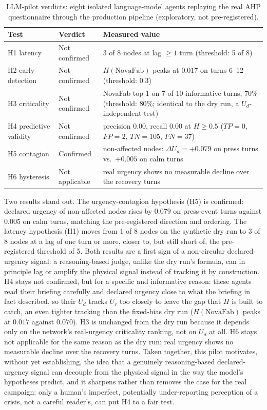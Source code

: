 \begin{table}[H]
\centering
\caption{LLM-pilot verdicts: eight isolated language-model agents replaying the real AHP questionnaire through the production pipeline (exploratory, not pre-registered).}
\label{tab:helios_llm_pilot}
\small
\begin{tabularx}{\linewidth}{>{\raggedright\arraybackslash}p{3.4cm} >{\raggedright\arraybackslash}p{2.4cm} X}
\toprule
\textbf{Test} & \textbf{Verdict} & \textbf{Measured value} \\
\midrule
H1 latency & Not confirmed & 3 of 8 nodes at lag $\ge 1$ turn (threshold: 5 of 8) \\
H2 early detection & Not confirmed & $H(\text{NovaFab})$ peaks at $0.017$ on turns 6--12 (threshold: $0.3$) \\
H3 criticality & Not confirmed & NovaFab top-1 on 7 of 10 informative turns, $70\%$ (threshold: $80\%$; identical to the dry run, a $U_d$-independent test) \\
H4 predictive validity & Not confirmed & precision $0.00$, recall $0.00$ at $H \ge 0.5$ ($TP=0$, $FP=2$, $TN=105$, $FN=37$) \\
H5 contagion & Confirmed & non-affected nodes: $\Delta U_d = +0.079$ on press turns vs.\ $+0.005$ on calm turns \\
H6 hysteresis & Not applicable & real urgency shows no measurable decline over the recovery turns \\
\bottomrule
\end{tabularx}
\end{table}

Two results stand out. The urgency-contagion hypothesis (H5) is confirmed: declared urgency of non-affected nodes rises by $0.079$ on press-event turns against $0.005$ on calm turns, matching the pre-registered direction and ordering. The latency hypothesis (H1) moves from 1 of 8 nodes on the synthetic dry run to 3 of 8 nodes at a lag of one turn or more, closer to, but still short of, the pre-registered threshold of 5. Both results are a first sign of a non-circular declared-urgency signal: a reasoning-based judge, unlike the dry run's formula, can in principle lag or amplify the physical signal instead of tracking it by construction. H4 stays not confirmed, but for a specific and informative reason: these agents read their briefing carefully and declared urgency close to what the briefing in fact described, so their $U_d$ tracks $U_r$ too closely to leave the gap that $H$ is built to catch, an even tighter tracking than the fixed-bias dry run ($H(\text{NovaFab})$ peaks at $0.017$ against $0.070$). H3 is unchanged from the dry run because it depends only on the network's real-urgency criticality ranking, not on $U_d$ at all. H6 stays not applicable for the same reason as the dry run: real urgency shows no measurable decline over the recovery turns. Taken together, this pilot motivates, without yet establishing, the idea that a genuinely reasoning-based declared-urgency signal can decouple from the physical signal in the way the model's hypotheses predict, and it sharpens rather than removes the case for the real campaign: only a human's imperfect, potentially under-reporting perception of a crisis, not a careful reader's, can put H4 to a fair test.

